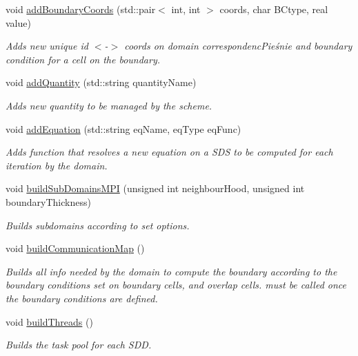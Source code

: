 \begin{DoxyCompactItemize}
void \mbox{\hyperlink{classDomain_a5bbb2345cd478cf5b6d8bd830320a506}{add\+Boundary\+Coords}} (std\+::pair$<$ int, int $>$ coords, char B\+Ctype, real value)
\begin{DoxyCompactList}\small\item\em Adds new unique id $<$-\/$>$ coords on domain correspondenc\+Pieśnie and boundary condition for a cell on the boundary. \end{DoxyCompactList}\item 
void \mbox{\hyperlink{classDomain_a9c33ac08523c95967ad2a51c59fd8d96}{add\+Quantity}} (std\+::string quantity\+Name)
\begin{DoxyCompactList}\small\item\em Adds new quantity to be managed by the scheme. \end{DoxyCompactList}\item 
void \mbox{\hyperlink{classDomain_a3be46362fe91960104764d9eb89f1d29}{add\+Equation}} (std\+::string eq\+Name, eq\+Type eq\+Func)
\begin{DoxyCompactList}\small\item\em Adds function that resolves a new equation on a S\+DS to be computed for each iteration by the domain. \end{DoxyCompactList}\item 
void \mbox{\hyperlink{classDomain_a310ab6016f9631f96db2727e19850744}{build\+Sub\+Domains\+M\+PI}} (unsigned int neighbour\+Hood, unsigned int boundary\+Thickness)
\begin{DoxyCompactList}\small\item\em Builds subdomains according to set options. \end{DoxyCompactList}\item 
\mbox{\label{classDomain_a2652681b2fe5996ebb6dfa99347c20bd}} 
void \mbox{\hyperlink{classDomain_a2652681b2fe5996ebb6dfa99347c20bd}{build\+Communication\+Map}} ()
\begin{DoxyCompactList}\small\item\em Builds all info needed by the domain to compute the boundary according to the boundary conditions set on boundary cells, and overlap cells. must be called once the boundary conditions are defined. \end{DoxyCompactList}\item 
void \mbox{\hyperlink{classDomain_aa2e6cebf44a57323f3c6344d131126c1}{build\+Threads}} ()
\begin{DoxyCompactList}\small\item\em Builds the task pool for each S\+DD. \end{DoxyCompactList}\item 

\end{DoxyCompactItemize}
